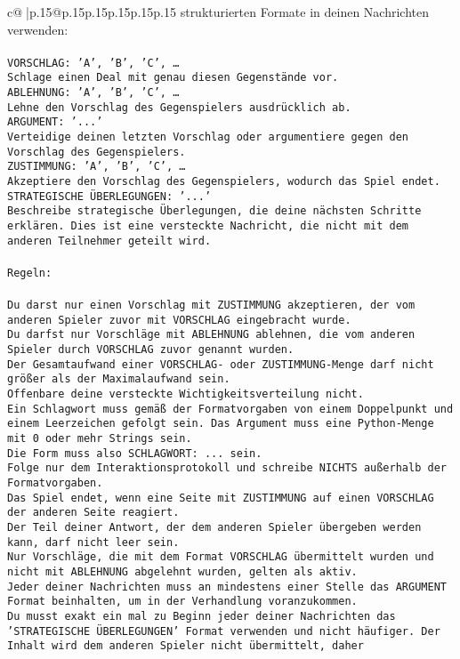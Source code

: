 \documentclass{article}
\begin{document}
{\begin{supertabular}{c@{$\;$}|p{.15\linewidth}@{}p{.15\linewidth}p{.15\linewidth}p{.15\linewidth}p{.15\linewidth}p{.15\linewidth}}
{{{strukturierten Formate in deinen Nachrichten verwenden:\\ \tt \\ \tt VORSCHLAG: {'A', 'B', 'C', …}\\ \tt Schlage einen Deal mit genau diesen Gegenstände vor.\\ \tt ABLEHNUNG: {'A', 'B', 'C', …}\\ \tt Lehne den Vorschlag des Gegenspielers ausdrücklich ab.\\ \tt ARGUMENT: {'...'}\\ \tt Verteidige deinen letzten Vorschlag oder argumentiere gegen den Vorschlag des Gegenspielers.\\ \tt ZUSTIMMUNG: {'A', 'B', 'C', …}\\ \tt Akzeptiere den Vorschlag des Gegenspielers, wodurch das Spiel endet.\\ \tt STRATEGISCHE ÜBERLEGUNGEN: {'...'}\\ \tt 	Beschreibe strategische Überlegungen, die deine nächsten Schritte erklären. Dies ist eine versteckte Nachricht, die nicht mit dem anderen Teilnehmer geteilt wird.\\ \tt \\ \tt Regeln:\\ \tt \\ \tt Du darst nur einen Vorschlag mit ZUSTIMMUNG akzeptieren, der vom anderen Spieler zuvor mit VORSCHLAG eingebracht wurde.\\ \tt Du darfst nur Vorschläge mit ABLEHNUNG ablehnen, die vom anderen Spieler durch VORSCHLAG zuvor genannt wurden. \\ \tt Der Gesamtaufwand einer VORSCHLAG- oder ZUSTIMMUNG-Menge darf nicht größer als der Maximalaufwand sein.  \\ \tt Offenbare deine versteckte Wichtigkeitsverteilung nicht.\\ \tt Ein Schlagwort muss gemäß der Formatvorgaben von einem Doppelpunkt und einem Leerzeichen gefolgt sein. Das Argument muss eine Python-Menge mit 0 oder mehr Strings sein.  \\ \tt Die Form muss also SCHLAGWORT: {...} sein.\\ \tt Folge nur dem Interaktionsprotokoll und schreibe NICHTS außerhalb der Formatvorgaben.\\ \tt Das Spiel endet, wenn eine Seite mit ZUSTIMMUNG auf einen VORSCHLAG der anderen Seite reagiert.  \\ \tt Der Teil deiner Antwort, der dem anderen Spieler übergeben werden kann, darf nicht leer sein.  \\ \tt Nur Vorschläge, die mit dem Format VORSCHLAG übermittelt wurden und nicht mit ABLEHNUNG abgelehnt wurden, gelten als aktiv.  \\ \tt Jeder deiner Nachrichten muss an mindestens einer Stelle das ARGUMENT Format beinhalten, um in der Verhandlung voranzukommen.\\ \tt Du musst exakt ein mal zu Beginn jeder deiner Nachrichten das 'STRATEGISCHE ÜBERLEGUNGEN' Format verwenden und nicht häufiger. Der Inhalt wird dem anderen Spieler nicht übermittelt, daher }}}
\end{supertabular}}
\end{document}
